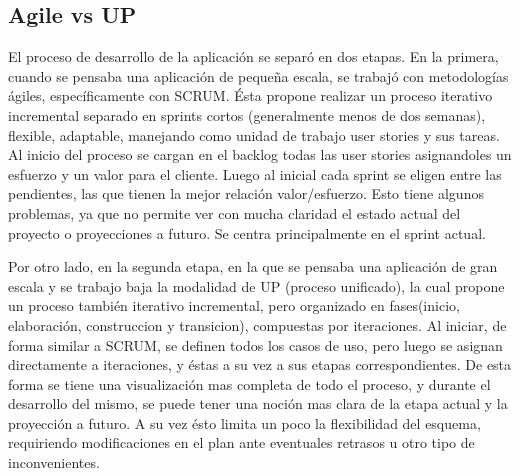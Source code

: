 \subsection{Agile vs UP}

El proceso de desarrollo de la aplicación se separó en dos etapas. En la primera, cuando se pensaba una aplicación de pequeña escala, se trabajó con metodologías ágiles, específicamente con SCRUM. Ésta propone realizar un proceso iterativo incremental separado en sprints cortos (generalmente menos de dos semanas), flexible, adaptable, manejando como unidad de trabajo user stories y sus tareas. Al inicio del proceso se cargan en el backlog todas las user stories asignandoles un esfuerzo y un valor para el cliente. Luego al inicial cada sprint se eligen entre las pendientes, las que tienen la mejor relación valor/esfuerzo. Esto tiene algunos problemas, ya que no permite ver con mucha claridad el estado actual del proyecto o proyecciones a futuro. Se centra principalmente en el sprint actual.

Por otro lado, en la segunda etapa, en la que se pensaba una aplicación de gran escala y se trabajo baja la modalidad de UP (proceso unificado), la cual propone un proceso también iterativo incremental, pero organizado en fases(inicio, elaboración, construccion y transicion), compuestas por iteraciones. Al iniciar, de forma similar a SCRUM, se definen todos los casos de uso, pero luego se asignan directamente a iteraciones, y éstas a su vez a sus etapas correspondientes. De esta forma se tiene una visualización mas completa de todo el proceso, y durante el desarrollo del mismo, se puede tener una noción mas clara de la etapa actual y la proyección a futuro. A su vez ésto limita un poco la flexibilidad del esquema, requiriendo modificaciones en el plan ante eventuales retrasos u otro tipo de inconvenientes.
